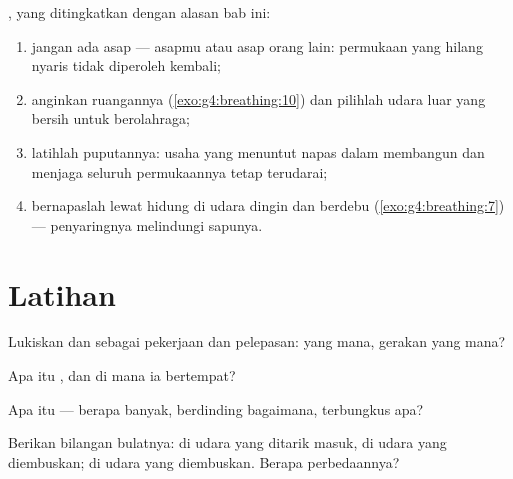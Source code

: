 \begin{method}\label{met:g7:lungs-and-gas-exchange:keep}
, yang ditingkatkan dengan alasan bab ini:
\begin{enumerate}
  \item jangan ada asap --- asapmu atau asap orang lain: permukaan
        yang hilang nyaris tidak diperoleh kembali;
  \item anginkan ruangannya (\cref{exo:g4:breathing:10}) dan pilihlah
        udara luar yang bersih untuk berolahraga;
  \item latihlah puputannya: usaha yang menuntut napas dalam membangun
          dan menjaga seluruh permukaannya tetap
        terudarai;
  \item bernapaslah lewat hidung di udara dingin dan berdebu
        (\cref{exo:g4:breathing:7}) --- penyaringnya melindungi
        sapunya.
\end{enumerate}
\end{method}

\section{Latihan}

\begin{exercise}[$\star$]\label{exo:g7:lungs-and-gas-exchange:1}
Lukiskan  dan  sebagai pekerjaan dan
pelepasan:  yang mana, gerakan yang mana?
\end{exercise}

\begin{exercise}[$\star$]\label{exo:g7:lungs-and-gas-exchange:2}
Apa itu , dan di mana ia bertempat?
\end{exercise}

\begin{exercise}[$\star$]\label{exo:g7:lungs-and-gas-exchange:3}
Apa itu  --- berapa banyak, berdinding bagaimana, terbungkus
apa?
\end{exercise}

\begin{exercise}[$\star$]\label{exo:g7:lungs-and-gas-exchange:4}
Berikan bilangan bulatnya:  di udara yang ditarik masuk, di
udara yang diembuskan;  di udara yang diembuskan. Berapa
perbedaannya?
\end{exercise}

